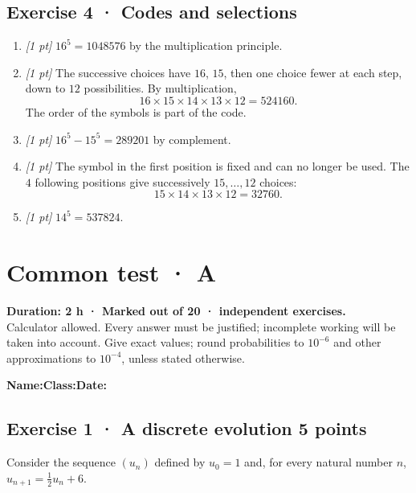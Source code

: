 \subsection*{Exercise 4 · Codes and selections}\begin{enumerate}

\item \textit{[1 pt]} $16^5=1048576$ by the multiplication principle.

\item \textit{[1 pt]} The successive choices have $16$, $15$, then one choice fewer at each step, down to $12$ possibilities. By multiplication,
\[16\times15\times14\times13\times12=524160.\]
The order of the symbols is part of the code.

\item \textit{[1 pt]} $16^5-15^5=289201$ by complement.

\item \textit{[1 pt]} The symbol in the first position is fixed and can no longer be used. The $4$ following positions give successively $15,\ldots,12$ choices:
\[15\times14\times13\times12=32760.\]

\item \textit{[1 pt]} $14^5=537824$.

\end{enumerate}

\fi

\ifmxteacher

\mxnewpage{}\label{sujet:3-3}

\section*{Common test · A}


\textbf{Duration: 2 h · Marked out of 20 ·  independent exercises.}\\Calculator allowed. Every answer must be justified; incomplete working will be taken into account. Give exact values; round probabilities to $10^{-6}$ and other approximations to $10^{-4}$, unless stated otherwise.

\smallskip\textbf{Name:}\enspace\dotfill\quad\textbf{Class:}\enspace\dotfill\quad\textbf{Date:}\enspace\dotfill

\subsection*{Exercise 1 · A discrete evolution \hfill 5 points}Consider the sequence $(u_n)$ defined by $u_0=1$ and, for every natural number $n$, $u_{n+1}=\frac{1}{2}u_n+6$.

